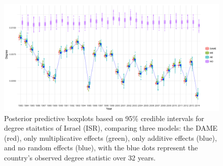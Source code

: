 \documentclass[a4paper]{article}
\begin{document}
\begin{figure}[H]
	\begin{center}
		\includegraphics[width=1\textwidth]{plots_paper/ISR79.png}	
	\end{center}
	\caption {Posterior predictive boxplots based on 95\% credible intervals for degree staitstics of Israel (ISR), comparing three models: the DAME (red), only multiplicative effects (green), only additive effects (blue), and no random effects (blue), with the blue dots represent the country's observed degree statistic over 32 years.}
	\label{figure:modelvalidation}
\end{figure}
\end{document}
